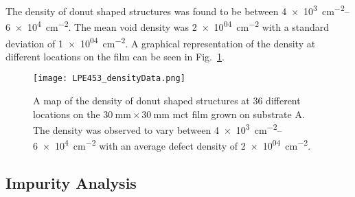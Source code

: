 
The density of donut shaped structures was found to be between \SIrange{4e+3}{6e+4}{\centi\metre^{-2}}. The mean void density was \SI{2e+04}{\centi\metre^{-2}} with a standard deviation of \SI{1e+04}{\centi\metre^{-2}}. A graphical representation of the density at different locations on the film can be seen in Fig.~\ref{fig:LPE453_densityData}.

\begin{figure}[htbp]
    \centering
    \texttt{[image: LPE453\_densityData.png]}
    \caption[Map of the density of donut shaped structures on the \ac{mct} film grown on substrate A.]{A map of the density of donut shaped structures at 36 different locations on the $\SI{30}{\milli\metre}\times\SI{30}{\milli\metre}$ \ac{mct} film grown on substrate A. The density was observed to vary between \SIrange{4e+3}{6e+4}{\centi\metre^{-2}} with an average defect density of \SI{2e+04}{\centi\metre^{-2}}.}
    \label{fig:LPE453_densityData}
\end{figure}


\subsection{Impurity Analysis}

